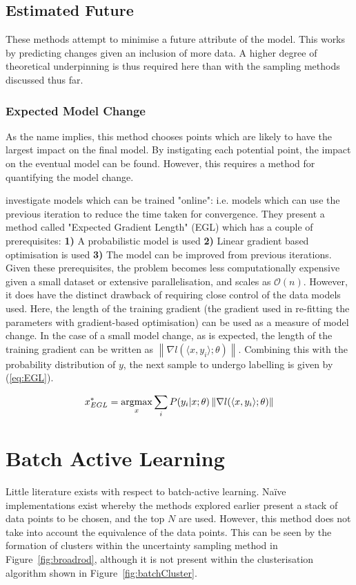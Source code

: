 \subsection{Estimated Future}
These methods attempt to minimise a future attribute of the model. This works by predicting changes given an inclusion of more data. A higher degree of theoretical underpinning is thus required here than with the sampling methods discussed thus far.

\subsubsection{Expected Model Change}
As the name implies, this method chooses points which are likely to have the largest impact on the final model. By instigating each potential point, the impact on the eventual model can be found. However, this requires a method for quantifying the model change.

\textcite{Set08,Set09} investigate models which can be trained "online": i.e. models which can use the previous iteration to reduce the time taken for convergence. They present a method called "Expected Gradient Length" (EGL) which has a couple of prerequisites: \textbf{1)} A probabilistic model is used \textbf{2)} Linear gradient based optimisation is used \textbf{3)} The model can be improved from previous iterations. Given these prerequisites, the problem becomes less computationally expensive given a small dataset or extensive parallelisation, and scales as $\mathcal{O}(n)$. However, it does have the distinct drawback of requiring close control of the data models used. Here, the length of the training gradient (the gradient used in re-fitting the parameters with gradient-based optimisation) can be used as a measure of model change. In the case of a small model change, as is expected, the length of the training gradient can be written as ${\left\|\nabla{}l(\langle{}x, y_i\rangle{};\theta{})\right\|}$. Combining this with the probability distribution of $y$, the next sample to undergo labelling is given by (\ref{eq:EGL}).

\begin{equation}
    \label{eq:EGL}
    x_{EGL}^*=\operatorname*{argmax}_x{\sum_i{P(y_i|x;\theta{})\left\|\nabla{}l(\langle{}x, y_i\rangle{};\theta{})\right\|}}
\end{equation}


\section{Batch Active Learning}
Little literature exists with respect to batch-active learning. Naïve implementations exist whereby the methods explored earlier present a stack of data points to be chosen, and the top $N$ are used. However, this method does not take into account the equivalence of the data points. This can be seen by the formation of clusters within the uncertainty sampling method in Figure~\ref{fig:broadrod}, although it is not present within the clusterisation algorithm shown in Figure~\ref{fig:batchCluster}.

